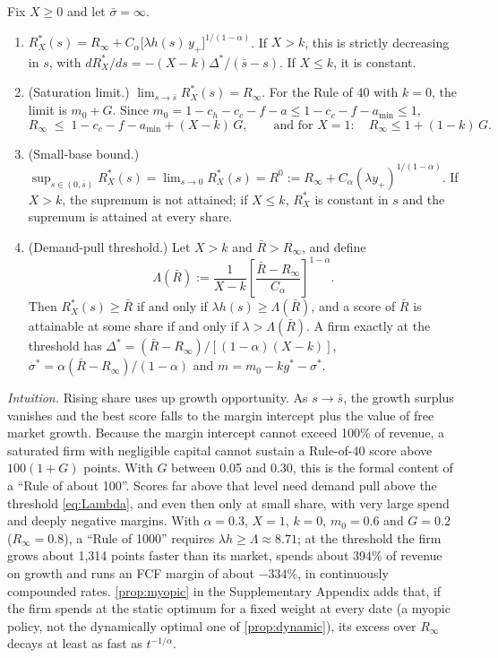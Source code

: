 \begin{lemma}\label{prop:saturation}
Fix $X\ge 0$ and let $\bar\sigma=\infty$.
\begin{enumerate}
\item[(a)] $R_X^*(s)=R_\infty+C_\alpha\bigl[\lambda h(s)\,y_+\bigr]^{1/(1-\alpha)}$. If $X>k$, this is strictly decreasing in $s$, with $dR_X^*/ds=-(X-k)\Delta^*/(\bar s-s)$. If $X\le k$, it is constant.
\item[(b)] (Saturation limit.) $\lim_{s\to\bar s}R_X^*(s)=R_\infty$. For the Rule of 40 with $k=0$, the limit is $m_0+G$. Since $m_0=1-c_h-c_c-f-a\le 1-c_c-f-a_{\min}\le 1$,
\begin{equation}\label{eq:rule100}
R_\infty\;\le\;1-c_c-f-a_{\min}+(X-k)\,G,\qquad\text{and for }X=1:\quad R_\infty\le 1+(1-k)\,G .
\end{equation}
\item[(c)] (Small-base bound.) $\sup_{s\in(0,\bar s)}R_X^*(s)=\lim_{s\to 0}R_X^*(s)=R^0:=R_\infty+C_\alpha(\lambda y_+)^{1/(1-\alpha)}$. If $X>k$, the supremum is not attained; if $X\le k$, $R_X^*$ is constant in $s$ and the supremum is attained at every share.
\item[(d)] (Demand-pull threshold.) Let $X>k$ and $\bar R>R_\infty$, and define
\begin{equation}\label{eq:Lambda}
\Lambda(\bar R):=\frac{1}{X-k}\left[\frac{\bar R-R_\infty}{C_\alpha}\right]^{1-\alpha}.
\end{equation}
Then $R_X^*(s)\ge\bar R$ if and only if $\lambda h(s)\ge\Lambda(\bar R)$, and a score of $\bar R$ is attainable at some share if and only if $\lambda>\Lambda(\bar R)$. A firm exactly at the threshold has $\Delta^*=(\bar R-R_\infty)/[(1-\alpha)(X-k)]$, $\sigma^*=\alpha(\bar R-R_\infty)/(1-\alpha)$ and $m=m_0-kg^*-\sigma^*$.
\end{enumerate}
\end{lemma}

\noindent\emph{Intuition.} Rising share uses up growth opportunity. As $s\to\bar s$, the growth surplus vanishes and the best score falls to the margin intercept plus the value of free market growth. Because the margin intercept cannot exceed 100\% of revenue, a saturated firm with negligible capital cannot sustain a Rule-of-40 score above $100(1+G)$ points. With $G$ between 0.05 and 0.30, this is the formal content of a ``Rule of about 100''. Scores far above that level need demand pull above the threshold \eqref{eq:Lambda}, and even then only at small share, with very large spend and deeply negative margins. With $\alpha=0.3$, $X=1$, $k=0$, $m_0=0.6$ and $G=0.2$ ($R_\infty=0.8$), a ``Rule of 1000'' requires $\lambda h\ge\Lambda\approx 8.71$; at the threshold the firm grows about 1{,}314 points faster than its market, spends about 394\% of revenue on growth and runs an FCF margin of about $-334\%$, in continuously compounded rates. \autoref{prop:myopic} in the Supplementary Appendix adds that, if the firm spends at the static optimum for a fixed weight at every date (a myopic policy, not the dynamically optimal one of \autoref{prop:dynamic}), its excess over $R_\infty$ decays at least as fast as $t^{-1/\alpha}$.

